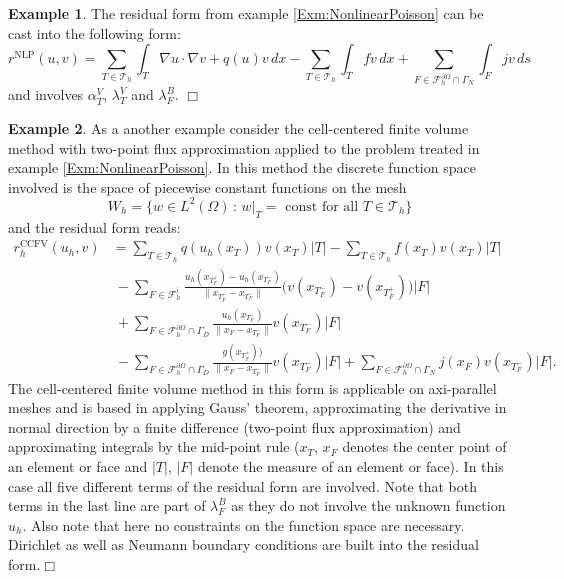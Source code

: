 \documentclass[a4paper,12pt]{article}
\theoremstyle{definition}
\newtheorem{exm}{Example}
\begin{document}
\begin{exm} \label{Exm:NonlinearPoissonDetailedResidualForm}
The residual form from example \ref{Exm:NonlinearPoisson} can be cast into the
following form:
\begin{equation*}
r^{\text{NLP}}(u,v) = 
\sum_{T\in\mathcal{T}_h} \int_T \nabla u \cdot \nabla v + q(u)v \,dx
- \sum_{T\in\mathcal{T}_h} \int_T fv \,dx 
+ \sum_{F\in\mathcal{F}_h^{\partial\Omega}\cap\Gamma_N} \int_{F} jv\,ds
\end{equation*}
and involves $\alpha_T^V$, $\lambda_T^V$ and $\lambda_F^B$. \hfill$\Box$
\end{exm}

\begin{exm} \label{Exm:FiniteVolumeMethod}
As a another example consider the cell-centered finite volume method with two-point
flux approximation applied to the problem treated in example \ref{Exm:NonlinearPoisson}.
In this method the discrete function space involved is the space of piecewise constant
functions on the mesh
\begin{equation*}
W_h = \{w\in L^2(\Omega) \,:\,  \text{$w|_T=$ const for all $T\in\mathcal{T}_h$}\}
\end{equation*}
and the residual form reads:
\begin{equation*}
\begin{split}
r_h^{\text{CCFV}}(u_h,v) 
& = \sum_{T\in\mathcal{T}_h} q(u_h(x_T)) v(x_T) |T|
- \sum_{T\in\mathcal{T}_h} f(x_T) v(x_T) |T|\\
&\ - \sum_{F\in\mathcal{F}_h^i} 
\frac{u_h(x_{T_F^+})-u_h(x_{T_F^-})}{\|x_{T_F^+} - x_{T_F^-}\|}
\bigl(v(x_{T_F^-}) - v(x_{T_F^+})\bigr) |F|\\
&\ + \sum_{F\in\mathcal{F}_h^{\partial\Omega}\cap\Gamma_D} 
\frac{u_h(x_{T_F^-})}{\|x_{F} - x_{T_F^-}\|} v(x_{T_F^-}) |F| \\
&\ - \sum_{F\in\mathcal{F}_h^{\partial\Omega}\cap\Gamma_D} 
\frac{g(x_{T_F^+}))}{\|x_{F} - x_{T_F^-}\|} v(x_{T_F^-}) |F|
+ \sum_{F\in\mathcal{F}_h^{\partial\Omega}\cap\Gamma_N} j(x_{F}) v(x_{T_F^-}) |F| .
\end{split}
\end{equation*}
The cell-centered finite volume method in this form is applicable on
axi-parallel meshes and is based in applying Gauss' theorem, approximating
the derivative in normal direction by a finite difference (two-point
flux approximation) and approximating integrals by the mid-point rule
($x_T$, $x_F$ denotes the center point of an element or face and 
$|T|$, $|F|$ denote the measure of an element or face).
In this case all five different terms of the residual form are involved.
Note that both terms in the last line are part of $\lambda_F^B$ as
they do not involve the unknown function $u_h$. 
Also note that here no constraints on the function space are necessary.
Dirichlet as well as Neumann boundary conditions are built into the
residual form.\hfill$\Box$
\end{exm}
\end{document}
